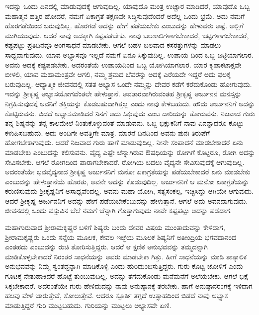 ಇದನ್ನು ಒಂದು ದಿನದಲ್ಲಿ ಮಾಡುವುದಕ್ಕೆ ಆಗುವುದಿಲ್ಲ. ಯಾವುದೊ ಮಂತ್ರ ಉಚ್ಚಾರ ಮಾಡಿದರೆ, ಯಾವುದೊ ಒಬ್ಬ ಮಹಾತ್ಮನ ಹತ್ತಿರ ಹೋದರೆ, ನಮಗೆ ಏಕಾಗ್ರತೆ ತಕ್ಷಣವೇ ಸಿದ್ಧಿಸುವುದೆಂದರೆ ಅದೆಲ್ಲ ಒಂದು ಭ್ರಮೆ. ಅದು ನಮಗೆ ಹೊರಗಡೆಯಿಂದ ಬರುವುದಿಲ್ಲ. ಹೊರಗಡೆ ಅದನ್ನು ಹೇಗೆ ಪಡೆಯಬೇಕು ಎಂಬುದನ್ನು ಹೇಳುವರು ಅಷ್ಟೆ. ಅಲ್ಲಿಗೆ ಮುಗಿಯುವುದು. ಆದರೆ ನಾವು ಅದಕ್ಕಾಗಿ ಕಷ್ಟಪಡಬೇಕು. ನಾವು ಬಲಶಾಲಿಗಳಾಗಬೇಕಾದರೆ, ಜಟ್ಟಿಗಳಾಗಬೇಕಾದರೆ, ಕಷ್ಟಪಟ್ಟು ಪ್ರತಿದಿನವೂ ಅಂಗಸಾಧನೆ ಮಾಡಬೇಕು. ಆಗಲೆ ಬಹಳ ಬಲವಾದ ಕಸರತ್ತುಗಳನ್ನು ಮಾಡಲು ಸಾಧ್ಯವಾಗುವುದು. ಯಾವ ಅಭ್ಯಾಸವೂ ಇಲ್ಲದೆ ನಮಗೆ ಏನೂ ಸಿಕ್ಕುವುದಿಲ್ಲ. ಉಪಾಯ ದಿಂದ ಒಬ್ಬ ಜಟ್ಟಿಯಾಗಲಾರ. ಅವನು ಅದಕ್ಕೆ ಕಷ್ಟಪಡಬೇಕು. ಅದರಂತೆಯೆ ಉಪಾಯದಿಂದ ಒಬ್ಬ ಯೋಗಿಯಾಗಲಾರ. ಯಾರ ಕೃಪಾಕಟಾಕ್ಷವೇ ಬೀಳಲಿ, ಯಾವ ಮಹಾಮಂತ್ರವೇ ಆಗಲಿ, ನಮ್ಮ ಶ್ರಮದ ಬೆವರನ್ನು ಅದಕ್ಕೆ ಎರೆಯದೇ ಇದ್ದರೆ ಅದು ಫಲಕ್ಕೆ ಬರುವುದಿಲ್ಲ. ಆಧ್ಯಾತ್ಮಿಕ ಜೀವನದಲ್ಲಿ ಸತತ ಅಭ್ಯಾಸ ಒಂದೇ ನಮ್ಮನ್ನು ದೇವರ ಕಡೆಗೆ ಕರೆದುಕೊಂಡು ಹೋಗುವುದು. ಇದನ್ನು ಶ‍್ರೀಕೃಷ್ಣ ಅಭ್ಯಾಸಯೋಗವೆಂತಲೇ ಹೇಳುತ್ತಾನೆ. ಅವತಾರವಾಗಿರುವಂತಹ ಶ‍್ರೀಕೃಷ್ಣ ಅರ್ಜುನನ ಮನಸ್ಸನ್ನು ನಿಗ್ರಹಿಸುವುದಕ್ಕೆ ಅವನಿಗೆ ಶಕ್ತಿಯನ್ನು ಕೊಡಬಹುದಾಗಿತ್ತಲ್ಲ ಎಂದು ನಾವು ಕೇಳಬಹುದು. ಹೌದು ಅರ್ಜುನನಿಗೆ ಅದನ್ನು ಕೊಟ್ಟಿರುವನು. ಬಿಡದೆ ಅಭ್ಯಾಸಮಾಡಿದರೆ ನಿನಗೆ ಅದು ಸಿಕ್ಕುವುದು ಎಂಬ ದಾರಿಯನ್ನು ತೋರುವನು. ನಿಜವಾದ ಗುರು ತನ್ನ ಶಿಷ್ಯನನ್ನು ತನ್ನ ಕಾಲಮೇಲೆ ನಿಂತುಕೊಳ್ಳುವಂತೆ ಮಾಡುವನು. ಒಬ್ಬ ಭಿಕ್ಷುಕನಿಗೆ ನಾವು ಏನನ್ನಾದರೂ ಕೊಟ್ಟು ಕಳುಹಿಸಬಹುದು. ಅದು ಅಂದಿಗೇ ಅವತ್ತಿಗೇ ಮಾತ್ರ. ಮಾರನೆ ದಿನದಿಂದ ಅವನು ಪುನಃ ತಿರುಪೆಗೆ ಹೋಗಬೇಕಾಗುವುದು. ಆದರೆ ನಿಜವಾದ ಗುರು ಹಾಗೆ ಮಾಡುವುದಿಲ್ಲ. ನೀನೇ ಸಂಪಾದನೆ ಮಾಡಬೇಕಾದರೆ ಏನು ಮಾಡಬೇಕು ಎಂಬುದನ್ನು ಕಲಿಸುವನು. ವೈದ್ಯ ಎಷ್ಟೇ ಚೆನ್ನಾಗಿರುವ ಔಷಧಿಯನ್ನು ರೋಗಿಗೆ ಕೊಟ್ಟರೂ, ರೋಗಿ ಅದನ್ನು ಸೇವಿಸಬೇಕು. ಆಗಲೆ ರೋಗದಿಂದ ಪಾರಾಗಬೇಕಾದರೆ. ರೋಗಿಯ ಬದಲು ವೈದ್ಯನೇ ಸೇವಿಸುವುದಕ್ಕೆ ಆಗುವುದಿಲ್ಲ. ಅದರಂತೆಯೇ ಭವವೈದ್ಯನಾದ ಶ‍್ರೀಕೃಷ್ಣ ಅರ್ಜುನನಿಗೆ ಮನೋ ಏಕಾಗ್ರತೆಯನ್ನು ಪಡೆಯಬೇಕಾದರೆ ಏನು ಮಾಡಬೇಕು ಎಂಬುದನ್ನು ಹೇಳುತ್ತಾನೆಯೆ ಹೊರತು, ಅವನೇ ಅದನ್ನು ಕೊಡುವುದಿಲ್ಲ. ಅರ್ಜುನನಿಗೆ ಆ ಮನೋ ಏಕಾಗ್ರತೆಯನ್ನು ಕರುಣಿಸುವುದು ಶ‍್ರೀಕೃಷ್ಣನಿಗೆ ಅಸಾಧ್ಯವೆಂದಲ್ಲ. ಅವನು ಮಹಾ ಯೋಗಿ, ಸತ್ಯಸಂಕಲ್ಪ, ಇಚ್ಛಿಸಿದ್ದು ಆಗಿಯೇ ಆಗುವುದು. ಆದರೆ ಶ‍್ರೀಕೃಷ್ಣ ಅರ್ಜುನನಿಗೆ ಅದನ್ನು ಹೇಗೆ ಪಡೆಯಬೇಕೆಂಬುದನ್ನು ಹೇಳುತ್ತಾನೆ. ಆಗಲೆ ಅದು ಅವನದಾಗುವುದು. ಜೀವನದಲ್ಲಿ ಒಂದು ವಸ್ತುವಿನ ಬೆಲೆ ನಮಗೆ ಚೆನ್ನಾಗಿ ಗೊತ್ತಾಗುವುದು ನಾವೇ ಕಷ್ಟಪಟ್ಟು ಅದನ್ನು ಪಡೆದಾಗ.

ಮಹಾಗುರುವಾದ ಶ‍್ರೀರಾಮಕೃಷ್ಣರ ಬಳಿಗೆ ಶಿಷ್ಯರು ಬಂದು ದೇವರ ವಿಷಯ ಮುಂತಾದುವನ್ನು ಕೇಳಿದಾಗ, ಶ‍್ರೀರಾಮಕೃಷ್ಣರು ಒಂದು ಸನ್ನೆಯ ಮೂಲಕ, ಕೇವಲ ಇಚ್ಛೆಯ ಮೂಲಕ ಶಿಷ್ಯನಿಗೆ ಅತೀಂದ್ರಿಯ ಭಗವದಾನಂದ ಎಂತಹದು ಎಂಬುದನ್ನು ರುಚಿ ತೋರಿಸುತ್ತಿದ್ದರು. ಆದರೆ ಆ ಕ್ಷಣಿಕ ಅನುಭವವನ್ನು ತಮ್ಮದನ್ನಾಗಿ ಮಾಡಿಕೊಳ್ಳಬೇಕಾದರೆ ನಿರಂತರ ಸಾಧನೆಯನ್ನು ಅವರು ಮಾಡಬೇಕಾ ಗಿತ್ತು. ಹೀಗೆ ಸಾಧನೆಯನ್ನು ಮಾಡಿ ತಾತ್ಕಾಲಿಕ ಅನುಭವವನ್ನು ನಿಮ್ಮ ಸ್ವಂತದ್ದನ್ನಾಗಿ ಮಾಡಿಕೊಳ್ಳಿ ಎಂದು ಹುರಿದುಂಬಿಸುತ್ತಿದ್ದರು. ಗುರು ಕೊಟ್ಟ ಜೋಳಿಗೆ ಎಂದು ಗೂಟಕ್ಕೆ ನೇತುಹಾಕಿದರೆ ಹೊಟ್ಟೆ ತುಂಬುವುದಿಲ್ಲ. ಅದನ್ನು ತೆಗೆದುಕೊಂಡು ಮನೆಮನೆಗೆ ಅಲೆಯಬೇಕು. ಆಗಲೆ ಭಿಕ್ಷೆ ಸಿಕ್ಕಬೇಕಾದರೆ. ಅದರಂತೆಯೇ ಗುರು ಹೇಳಿದುದನ್ನು ನಾವು ಅನುಷ್ಠಾನಕ್ಕೆ ತರಬೇಕು. ಹಾಗೆ ಅನುಷ್ಠಾನರಂಗಕ್ಕೆ ಇಳಿದಾಗ ಹಲವು ವೇಳೆ ಜಾರುತ್ತೇವೆ, ಸೋಲುತ್ತೇವೆ. ಆದರೂ ಸ್ಫೂರ್ತಿ ತಗ್ಗದೆ ಉತ್ಸಾಹದಿಂದ ಬಿಡದೆ ನಾವು ಅಭ್ಯಾಸ ಮಾಡುತ್ತಿದ್ದರೆ ಗುರಿ ಮುಟ್ಟಬಹುದು. ಗುರಿಯನ್ನು ಮುಟ್ಟಲು ಅಭ್ಯಾಸವೇ ಏಣಿ.

